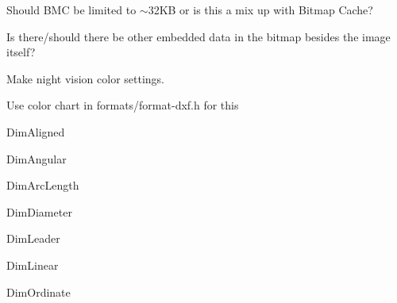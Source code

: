 \begin{DoxyRefList}
\label{todo__todo000011}%
%
Should BMC be limited to $\sim$32\+KB or is this a mix up with Bitmap Cache? 



Is there/should there be other embedded data in the bitmap besides the image itself?  
\item[Member \mbox{\hyperlink{mainwindow_8cpp_a9ae7b1e4de8bb7661879f4317d6d3cb9}{night\+\_\+vision\+\_\+action}} (String args)]\label{todo__todo000007}%
%
Make night vision color settings.  
\item[Member \mbox{\hyperlink{embroidermodder_8h_a29bcbce98e36705fa9c1577a227d53c0a21cbc22cd57ac906315fac3d245a25b9}{OBJ\+\_\+\+LTYPE}} ]\label{todo__todo000002}%
%
Use color chart in formats/format-\/dxf.\+h for this  
\item[Member \mbox{\hyperlink{classPropertyEditor_af677b799a39d2374c702087e23fb6b3c}{Property\+Editor\+::clear\+All\+Fields}} ()]\label{todo__todo000020}%
%
Dim\+Aligned 



Dim\+Angular 



Dim\+Arc\+Length 



Dim\+Diameter 



Dim\+Leader 



Dim\+Linear 



Dim\+Ordinate 




\end{DoxyRefList}
